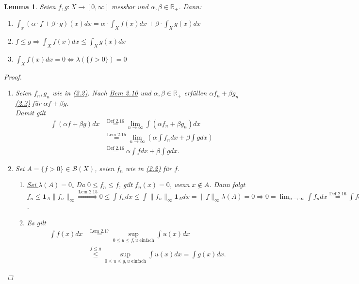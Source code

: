 \documentclass[a4paper]{report}
\newcommand{\doubleOne}{\textbf{1}}
\newcommand{\R}{\mathbb{R}}
\newcommand{\Borel}{\mathcal{B}}
\newcommand{\toInf}{\rightarrow \infty}
\newcommand{\limToInf}[1]{\lim_{#1 \toInf}}
\newcommand{\jlabel}[1]{\label{j_#1}}
\newcommand{\jshortlink}[1]{\jhyperref{#1}{\text{#1}}}
\newcommand{\jhyperref}[2]{\hyperref[j_#1]{#2}}
\newcommand{\jlink}[1]{\jhyperref{#1}{#1}}
\theoremstyle{plain}
\newtheorem{lem}[thm]{Lemma}
\theoremstyle{definition}
\begin{document}
{{{\begin{lem}
\jlabel{Lem 2.18}
    Seien $f,g: X \rightarrow [0,\infty]$ messbar und $\alpha, \beta \in \R_+$. Dann:
    \begin{enumerate}
        \item $\int_x(\alpha\cdot f + \beta\cdot g)(x)dx = \alpha \cdot \int_X f(x) dx + \beta \cdot \int_X g(x) dx$
        \item $f \le g \Rightarrow \int_X f(x) dx \le \int_X g(x) dx$
        \item $\int_X f(x) dx = 0 \Leftrightarrow \lambda(\{f > 0\}) = 0$
    \end{enumerate}
    \begin{proof}
        \begin{enumerate}
            \item Seien $f_n,g_n$ wie in \jlink{(2.2)}. Nach \jlink{Bem 2.10} und $\alpha, \beta \in \R_+$ erfüllen $\alpha f_n + \beta g_n$ \jlink{(2.2)} für $\alpha f + \beta g$.\\
            Damit gilt
            \begin{displaymath}
                \begin{split}
                    \int(\alpha f + \beta g)dx &\overset{\jshortlink{Def 2.16}}{=} \limToInf{n} \int (\alpha f_n + \beta g_n)dx \\
                    &\overset{\jshortlink{Lem 2.15}}{=} \limToInf{n}(\alpha \int f_n dx + \beta \int g dx)\\
                    &\overset{\jshortlink{Def 2.16}}{=} \alpha \int fdx + \beta \int g dx.
                \end{split}
            \end{displaymath}
            \item Sei $A = \{f > 0\} \in \Borel(X)$, seien $f_n$ wie in \jlink{(2.2)} für $f$.
                \begin{enumerate}
                    \item
                        \uline{Sei $\lambda(A) = 0$.} Da $0 \le f_n \le f$, gilt $f_n(x)=0$, wenn $x \notin A$. Dann folgt $f_n \le \doubleOne_A \lVert f_n \rVert_\infty \overset{\jshortlink{Lem 2.15}}{\Rightarrow} 0 \le \int f_n dx \le \int \lVert f_n \rVert_\infty \doubleOne_A dx = \lVert f \rVert_\infty \lambda(A) = 0 \Rightarrow 0 = \limToInf{n} \int f_n dx \overset{\jshortlink{Def 2.16}}{=} \int f dx$.
                    \item Es gilt
                        \begin{displaymath}
                            \begin{split}
                                \int f(x)dx &\overset{\jshortlink{Lem 2.17}}{=} \sup_{0\le u\le f, u \text{ einfach}} \int u(x)dx\\
                                &\overset{f\le g}{\le} \sup_{0\le u\le g, u \text{ einfach}} \int u(x)dx = \int g(x) dx.
                            \end{split}
                        \end{displaymath} 


\end{enumerate}
\end{enumerate}
\end{proof}
\end{lem}}}}
\end{document}
